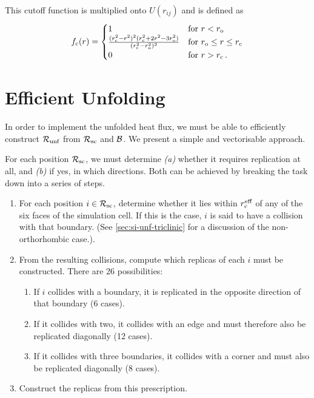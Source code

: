 This cutoff function is multiplied onto $U(r_{ij})$ and is defined as 
\begin{equation}
	f_{\text{c}}(r) = \begin{cases}
		1 &  \text{for } r < r_{\text{o}} \\
		\frac{(r_{\text{c}}^2 - r^2)^2 (r_{\text{c}}^2 + 2 r^2 - 3 r_{\text{o}}^2)}{(r_{\text{c}}^2 - r_{\text{o}}^2)^3} & \text{for } r_{\text{o}} \leq r \leq r_{\text{c}} \\
		0 &  \text{for } r > r_{\text{c}} \, .
	\end{cases}
\end{equation}

\section{Efficient Unfolding}
\label{sec:si-unf_imp}

In order to implement the unfolded heat flux, we must be able to efficiently construct $\mathcal{R_{\text{unf}}}$ from $\mathcal{R_{\text{sc}}}$ and $\mathcal{B}$. We present a simple and vectorisable approach.

 For each position $\mathcal{R_{\text{sc}}}$, we must determine \emph{(a)} whether it requires replication at all, and \emph{(b)} if yes, in which directions. Both can be achieved by breaking the task down into a series of steps.
\begin{enumerate}[itemsep=0pt,topsep=0.5\baselineskip]
  \item For each position $i \in \mathcal{R_{\text{sc}}}$, determine whether it lies within $r_{\text{c}}^{\text{eff}}$ of any of the six faces of the simulation cell. If this is the case, $i$ is said to have a collision with that boundary. (See \cref{sec:si-unf-triclinic} for a discussion of the non-orthorhombic case.).
  \item From the resulting collisions, compute which replicas of each $i$ must be constructed. There are 26 possibilities: 
  \begin{enumerate}
    \item If $i$ collides with a boundary, it is replicated in the opposite direction of that boundary (6 cases).
    \item If it collides with two, it collides with an edge and must therefore also be replicated diagonally (12 cases).
    \item If it collides with three boundaries, it collides with a corner and must also be replicated diagonally (8 cases).
  \end{enumerate}
  \item Construct the replicas from this prescription.
\end{enumerate}

